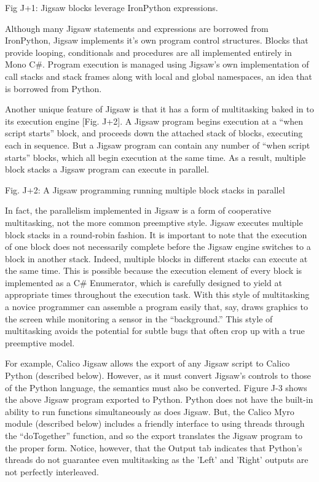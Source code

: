 \documentclass[preprint]{sigplanconf}
\begin{document}
Fig J+1: Jigsaw blocks leverage IronPython expressions.


Although many Jigsaw statements and expressions are borrowed from IronPython, Jigsaw implements it’s own program control structures. Blocks that provide looping, conditionals and procedures are all implemented entirely in Mono C\#. Program execution is managed using Jigsaw’s own implementation of call stacks and stack frames along with local and global namespaces, an idea that is borrowed from Python.


Another unique feature of Jigsaw is that it has a form of multitasking baked in to its execution engine [Fig. J+2]. A Jigsaw program begins execution at a ``when script starts'' block, and proceeds down the attached stack of blocks, executing each in sequence. But a Jigsaw program can contain any number of ``when script starts'' blocks, which all begin execution at the same time. As a result, multiple block stacks a Jigsaw program can execute in parallel. 



Fig. J+2: A Jigsaw programming running multiple block stacks in parallel


In fact, the parallelism implemented in Jigsaw is a form of cooperative multitasking, not the more common preemptive style. Jigsaw executes multiple block stacks in a round-robin fashion. It is important to note that the execution of one block does not necessarily complete before the Jigsaw engine switches to a block in another stack. Indeed, multiple blocks in different stacks can execute at the same time. This is possible because the execution element of every block is implemented as a C\# Enumerator, which is carefully designed to yield at appropriate times throughout the execution task. With this style of multitasking a novice programmer can assemble a program easily that, say, draws graphics to the screen while monitoring a sensor in the ``background.'' This style of multitasking avoids the potential for subtle bugs that often crop up with a true preemptive model.


For example, Calico Jigsaw allows the export of any Jigsaw script to Calico Python (described below). However, as it must convert Jigsaw's controls to those of the Python language, the semantics must also be converted. Figure J-3 shows the above Jigsaw program exported to Python. Python does not have the built-in ability to run functions simultaneously as does Jigsaw. But, the Calico Myro module (described below) includes a friendly interface to using threads through the ``doTogether'' function, and so the export translates the Jigsaw program to the proper form. Notice, however, that the Output tab indicates that Python's threads do not guarantee even multitasking as the 'Left' and 'Right' outputs are not perfectly interleaved.
\end{document}
